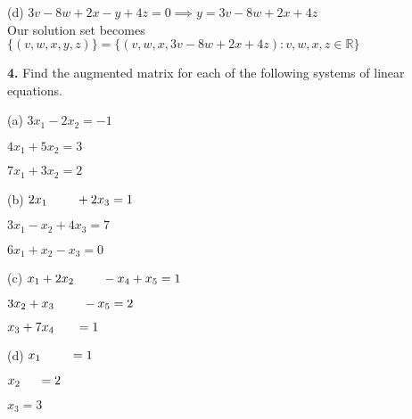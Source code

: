 \documentclass[addpoints]{exam}
\begin{document}
\begin{questions}
\begin{solution}
        (d) $ 3v - 8w + 2x - y + 4z = 0 \implies y = 3v - 8w + 2x + 4z $ \\
        Our solution set becomes $ \{ (v, w, x, y, z) \} = \{ (v, w, x, 3v - 8w + 2x + 4z) : v, w, x, z \in \mathbb{R} \} $
    \end{solution}

    \question
    \textbf{4. } Find the augmented matrix for each of the following systems of linear equations.

    \hspace{3mm} (a) $ 3x_1 - 2x_2 = -1 $ 

    \hspace{9mm} $ 4x_1 + 5x_2 = 3 $

    \hspace{9mm} $ 7x_1 + 3x_2 = 2 $

    \hspace{3mm} (b) $ 2x_1 \text{\hspace{8mm}} + 2x_3 = 1 $

    \hspace{9mm} $ 3x_1 - x_2 + 4x_3 = 7 $

    \hspace{9mm} $ 6x_1 + x_2 - x_3 = 0 $

    \hspace{3mm} (c) $ x_1 + 2x_2 \text{\hspace{8mm}} - x_4 + x_5 = 1 $

    \hspace{17mm} $ 3x_2 + x_3 \text{\hspace{8mm}} - x_5 = 2 $ 

    \hspace{27mm} $ x_3 + 7x_4 \text{\hspace{6mm}} = 1 $

    \hspace{3mm} (d) $ x_1 \text{\hspace{8mm}} = 1 $

    \hspace{12mm} $ x_2 \text{\hspace{5mm}} = 2 $

    \hspace{17mm} $ x_3 = 3 $
    \begin{solution}
        

\end{solution}
\end{questions}
\end{document}
